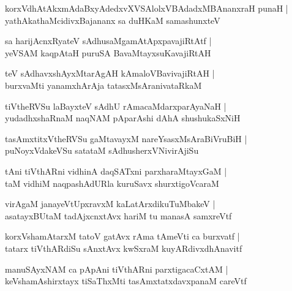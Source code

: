 \documentclass[twoside,12pt,openright]{book}
\newcounter{shloka}[chapter]
\begin{document}
\begin{shloka}%
korxVdhAtAkxmAdaBxyAdedxvXVSAlolxVBAdadxMBAnanxraH punaH |\\
yathAkathaMcidivxBajananx sa duHKaM samashunxteV 
\end{shloka}

\begin{shloka}%
sa harijAcnxRyateV sAdhusaMgamAtApxpavajiRtAtf |\\
yeVSAM kaqpAtaH puruSA BavaMtayxsuKavajiRtAH 
\end{shloka}

\begin{shloka}%
teV sAdhavxshAyxMtarAgAH kAmaloVBavivajiRtAH |\\
burxvaMti yanamxhArAja tatasxMsAranivataRkaM 
\end{shloka}

\begin{shloka}%
tiVtheRVSu laBayxteV sAdhU rAmacaMdarxparAyaNaH |\\
yudadhxshaRnaM naqNAM pAparAshi dAhA shushukaSxNiH
\end{shloka}

\begin{shloka}%
tasAmxtitxVtheRVSu gaMtavayxM nareYsasxMsAraBiVruBiH |\\
puNoyxVdakeVSu satataM sAdhusherxVNivirAjiSu
\end{shloka}

\begin{shloka}%
tAni tiVthARni vidhinA daqSATxni parxharaMtayxGaM |\\
taM vidhiM naqpashAdURla kuruSavx shurxtigoVcaraM 
\end{shloka}

\begin{shloka}%
virAgaM janayeVtUpxravxM kaLatArxdikuTuMbakeV |\\
asatayxBUtaM tadAjxcnxtAvx hariM tu manasA samxreVtf
\end{shloka}

\begin{shloka}%
korxVshamAtarxM tatoV gatAvx rAma tAmeVti ca burxvatf |\\
tatarx tiVthARdiSu sAnxtAvx kwSxraM kuyARdivxdhAnavitf 
\end{shloka}

\begin{shloka}%
manuSAyxNAM ca pApAni tiVthARni parxtigacaCxtAM |\\
keVshamAshirxtayx tiSaThxMti tasAmxtatxdavxpanaM careVtf
\end{shloka}
\end{document}
